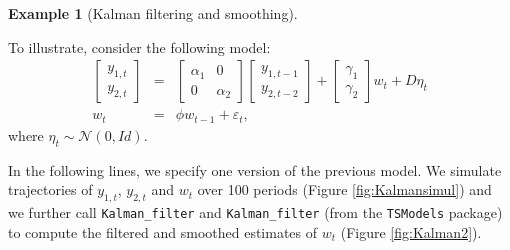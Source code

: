 \documentclass[
  12pt,
]{book}
\theoremstyle{definition}
\theoremstyle{definition}
\newtheorem{example}{Example}[chapter]
\theoremstyle{definition}
\theoremstyle{definition}
\theoremstyle{remark}
\begin{document}
\begin{example}[Kalman filtering and smoothing]
\protect\hypertarget{exm:RKalman}{}\label{exm:RKalman}

To illustrate, consider the following model:
\begin{eqnarray}
\left[\begin{array}{c}
y_{1,t}\\
y_{2,t}
\end{array}\right] & = &
\left[\begin{array}{cc}
\alpha_{1} & 0\\
0 & \alpha_{2}
\end{array}\right]
\left[\begin{array}{c}
y_{1,t-1}\\
y_{2,t-2}
\end{array}\right]+\left[\begin{array}{c}
\gamma_{1}\\
\gamma_{2}
\end{array}\right]w_{t}+ D\eta_t\label{eq_measur}\\
w_{t} & = & \phi w_{t-1}+\varepsilon_{t},\label{eq_trans}
\end{eqnarray}
where \(\eta_t \sim \mathcal{N}(0,Id)\).

In the following lines, we specify one version of the previous model. We simulate trajectories of \(y_{1,t}\), \(y_{2,t}\) and \(w_t\) over 100 periods (Figure \ref{fig:Kalmansimul}) and we further call \texttt{Kalman\_filter} and \texttt{Kalman\_filter} (from the \texttt{TSModels} package) to compute the filtered and smoothed estimates of \(w_t\) (Figure \ref{fig:Kalman2}).


\end{example}
\end{document}

